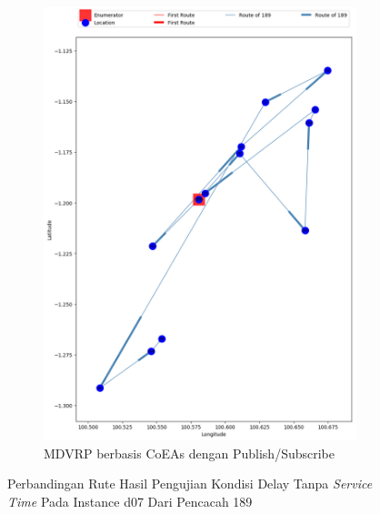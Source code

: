 \begin{figure}[H]\ContinuedFloat
	\centering
	\begin{subfigure}[t]{\textwidth}
		\centering
		\includegraphics[width=\textwidth]{Resources/Images/delayed_7/real_m15_n100_delayed_7_189_pubsub_coes}
		\caption{MDVRP berbasis CoEAs dengan Publish/Subscribe}
		\label{fig:real_m15_n100_delayed_7_189_pubsub_coes}
	\end{subfigure}
	\caption{Perbandingan Rute Hasil Pengujian Kondisi Delay Tanpa \textit{Service Time} Pada Instance d07 Dari Pencacah 189}
	\label{fig:real_m15_n100_delayed_7_189_contd}
\end{figure}


